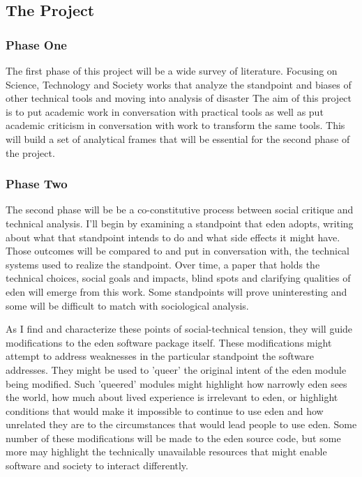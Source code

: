 \documentclass[a4paper,man,natbib]{apa6}
\begin{document}
   \subsection*{The Project}
   \subsubsection*{Phase One}
   The first phase of this project will be a wide survey of literature. Focusing on Science, Technology and Society works that analyze the standpoint and biases of other technical tools and moving into analysis of disaster 
   The aim of this project is to put academic work in conversation with practical tools as well as put academic criticism in conversation with work to transform the same tools. This will build a set of analytical frames that will be essential for the second phase of the project.  
   \subsubsection*{Phase Two}
   The second phase will be be a co-constitutive process between social critique and technical analysis. I'll begin by examining a standpoint that \acrshort{eden} adopts, writing about what that standpoint intends to do and what side effects it might have. Those outcomes will be compared to and put in conversation with, the technical systems used to realize the standpoint. Over time, a paper that holds the technical choices, social goals and impacts, blind spots and clarifying qualities of \acrshort{eden} will emerge from this work. Some standpoints will prove uninteresting and some will be difficult to match with sociological analysis. 

   As I find and characterize these points of social-technical tension, they will guide modifications to the \acrshort{eden} software package itself. These modifications might attempt to address weaknesses in the particular standpoint the software addresses. They might be used to 'queer' the original intent of the \acrshort{eden} module being modified. Such 'queered' modules might highlight how narrowly \acrshort{eden} sees the world, how much about lived experience is irrelevant to \acrshort{eden}, or highlight conditions that would make it impossible to continue to use \acrshort{eden} and how unrelated they are to the circumstances that would lead people to use \acrshort{eden}. Some number of these modifications will be made to the \acrshort{eden} source code, but some more may highlight the technically unavailable resources that might enable software and society to interact differently.
\end{document}
